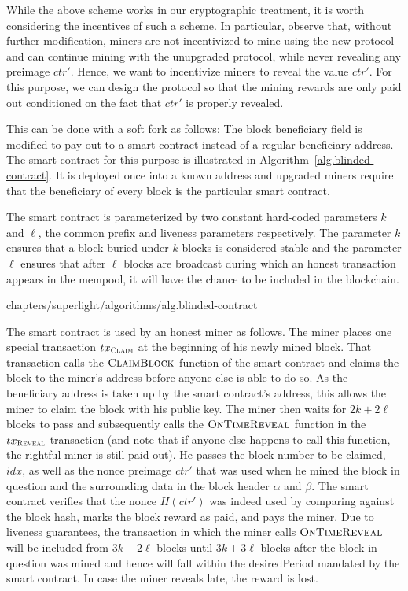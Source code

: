 While the above scheme works in our cryptographic treatment, it is worth
considering the incentives of such a scheme. In particular, observe that,
without further modification, miners are not incentivized to mine using the new
protocol and can continue mining with the unupgraded protocol, while never
revealing any preimage $ctr'$. Hence, we want to incentivize miners to reveal
the value $ctr'$. For this purpose, we can design the protocol so that the
mining rewards are only paid out conditioned on the fact that $ctr'$ is
properly revealed.

This can be done with a soft fork as follows: The block
beneficiary field is modified to pay out to a smart contract instead of a regular
beneficiary address. The smart contract for this purpose is illustrated in
Algorithm~\ref{alg.blinded-contract}. It is deployed once into
a known address and upgraded miners require that the beneficiary of every block
is the particular smart contract.

 The smart contract is parameterized by two
constant hard-coded parameters $k$ and $\ell$, the common prefix and liveness
parameters respectively. The parameter $k$ ensures that a block buried under $k$
blocks is considered stable and the parameter $\ell$ ensures that after $\ell$
blocks are broadcast during which an honest transaction appears in the mempool,
it will have the chance to be included in the blockchain.

{chapters/superlight/algorithms/alg.blinded-contract}

The smart contract is used by an honest miner as follows. The miner places one special
transaction $tx_\textsc{Claim}$ at the beginning of his newly mined block. That transaction calls
the $\textsc{ClaimBlock}$ function of the smart contract and claims the block to
the miner's address before anyone else is able to do so. As the beneficiary
address is taken up by the smart contract's address, this allows the miner to
claim the block with his public key. The miner then waits for $2k + 2\ell$
blocks to pass and subsequently calls the $\textsc{OnTimeReveal}$ function in
the $tx_\textsc{Reveal}$ transaction (and note that if anyone else happens to
call this function, the rightful miner is still paid out). He
passes the block number to be claimed, $idx$, as well as the nonce preimage
$ctr'$ that was used when he mined the block in question and the surrounding
data in the block header $\alpha$ and $\beta$. The smart contract verifies that
the nonce $H(ctr')$ was indeed used by comparing against the block hash, marks
the block reward as paid, and pays the miner. Due to liveness guarantees, the
transaction in which the miner calls $\textsc{OnTimeReveal}$ will be included
from $3k + 2\ell$ blocks until $3k + 3\ell$ blocks after the block in question
was mined and hence will fall within the \textsf{desiredPeriod} mandated by the
smart contract. In case the miner reveals late, the reward is lost.

